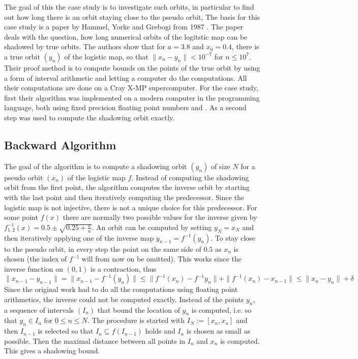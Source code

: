     The goal of this the case study is to investigate such orbits, in particular to find out how long there is an orbit staying close to the pseudo orbit,
    The basis for this case study is a paper by Hammel, Yorke and Grebogi from 1987 \cite{Hammel1987}.
    The paper deals with the question, how long numerical orbits of the logitstic map can be shadowed by true orbits.
    The authors show that for $a = 3.8$ and $x_0 = 0.4$, there is a true orbit $(y_n)$ of the logistic map, so that $\| x_n - y_n \| < 10^{-7}$ for $n \leq 10^7$.
    Their proof method is to compute bounds on the points of the true orbit by using a form of interval arithmetic and letting a computer do the computations. 
    All their computations are done on a Cray X-MP supercomputer. 
    For the case study, first their algorithm was implemented on a modern computer in the \cc programming language, both using fixed precision floating point numbers and \irram. 
    As a second step \irram was used to compute the shadowing orbit exactly.
  \subsection{Backward Algorithm}
    The goal of the algorithm is to compute a shadowing orbit $(y_n)$ of size $N$ for a pseudo orbit $(x_n)$ of the logistic map $f$.
    Instead of computing the shadowing orbit from the first point, the algorithm computes the inverse orbit by starting with the last point and then iteratively computing the predecessor. 
    Since the logistic map is not injective, there is not a unique choice for this predecessor. 
    For some point $f(x)$ there are normally two possible values for the inverse given by $f^{-1}_{1,2}(x) = 0.5 \pm \sqrt{0.25 + \frac{x}{a}} $.
    An orbit can be computed by setting $y_N = x_N$ and then iteratively applying one of the inverse map $y_{n-1} = f^{-1}(y_n)$.   To stay close to the pseudo orbit, in every step the point on the same side of $0.5$ as $x_n$ is chosen (the index of $f^{-1}$ will from now on be omitted). 
    This works since the inverse function on $(0,1)$ is a contraction, thus
    $$ \| x_{n-1} - y_{n-1} \| = \| x_{n-1} - f^{-1}(y_n) \| \leq \| f^{-1}(x_n) - f^{-1}{y_n} \| + \| f^{-1}(x_n) - x_{n-1} \| \leq \| x_n - y_n \| + \delta $$   
    Since the original work had to do all the computations using floating point arithmetics, the inverse could not be computed exactly.
    Instead of the points $y_n$, a sequence of intervals $(I_n)$ that bound the location of $y_n$ is computed, i.e. so that $y_n \in I_n \text{ for } 0 \leq n \leq N$.
    The procedure is started with $I_N := [x_n, x_n]$ and then $I_{n-1}$ is selected so that $I_n \subseteq f(I_{n-1})$ holds and $I_n$ is chosen as small as possible. 
    Then the maximal distance between all points in $I_n$ and $x_n$ is computed.
    This gives a shadowing bound.
